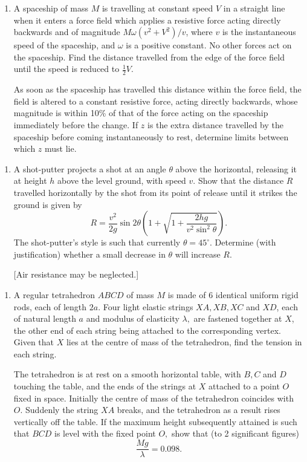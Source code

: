 \documentclass[a4, 11pt]{report}
\newlength{\qspace}
\newcounter{qnumber}
\newenvironment{question}%
 {\vspace{\qspace}
  \begin{enumerate}[\bfseries 1\quad][10]%
    \setcounter{enumi}{\value{qnumber}}%
    \item%
 }
{
  \end{enumerate}
  \filbreak
  \stepcounter{qnumber}
 }
\begin{document}
	
\begin{question}
A spaceship of mass $M$ is travelling at constant speed $V$ in a
straight line when it enters a force field which applies a resistive
force acting directly backwards and of magnitude \phantom{ }$M\omega(v^{2}+V^{2})/v$,
where $v$ is the instantaneous speed of the spaceship, and $\omega$
is a positive constant. No other forces act on the spaceship. Find
the distance travelled from the edge of the force field until the
speed is reduced to $\frac{1}{2}V$. 


As soon as the spaceship has travelled this distance within the force
field, the field is altered to a constant resistive force, acting
directly backwards, whose magnitude is within 10\% of that of the
force acting on the spaceship immediately before the change. If $z$
is the extra distance travelled by the spaceship before coming instantaneously
to rest, determine limits between which $z$ must lie. 
	\end{question}
	
\begin{question}	
A shot-putter projects a shot at an angle $\theta$ above the horizontal,
releasing it at height $h$ above the level ground, with speed $v$.
Show that the distance $R$ travelled horizontally by the shot from
its point of release until it strikes the ground is given by 
\[
R=\frac{v^{2}}{2g}\sin2\theta\left(1+\sqrt{1+\frac{2hg}{v^{2}\sin^{2}\theta}}\right).
\]
The shot-putter's style is such that currently $\theta=45^{\circ}$.
Determine (with justification) whether a small decrease in $\theta$
will increase $R$. 


{[}Air resistance may be neglected.{]}
\end{question}


\begin{question}A regular tetrahedron $ABCD$ of mass $M$ is made of 6 identical
uniform rigid rods, each of length $2a.$ Four light elastic strings
$XA,XB,XC$ and $XD$, each of natural length $a$ and modulus of
elasticity $\lambda,$ are fastened together at $X$, the other end
of each string being attached to the corresponding vertex. Given that
$X$ lies at the centre of mass of the tetrahedron, find the tension
in each string. 


The tetrahedron is at rest on a smooth horizontal table, with $B,C$
and $D$ touching the table, and the ends of the strings at $X$ attached
to a point $O$ fixed in space. Initially the centre of mass of the
tetrahedron coincides with $O.$ Suddenly the string $XA$ breaks,
and the tetrahedron as a result rises vertically off the table. If
the maximum height subsequently attained is such that $BCD$ is level
with the fixed point $O,$ show that (to 2 significant figures) 
\[
\frac{Mg}{\lambda}=0.098.
\]
\end{question}
	
\end{document}

